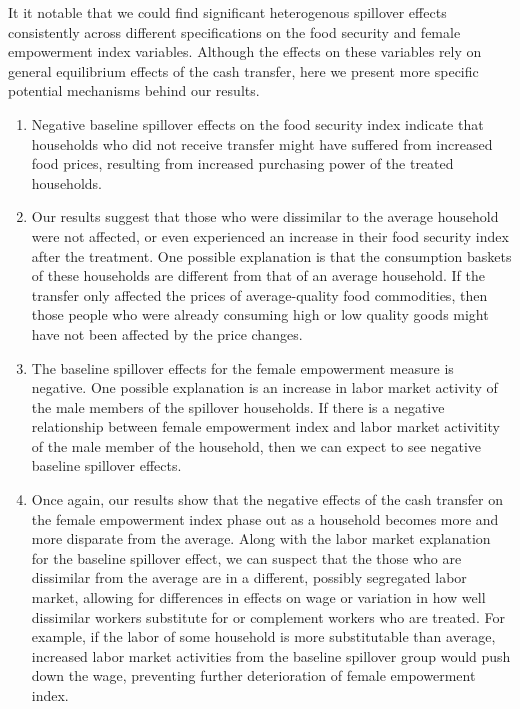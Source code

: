 \documentclass[11pt]{article}
\begin{document}
    It it notable that we could find significant heterogenous spillover effects consistently across different specifications on the food security and female empowerment index variables. Although the effects on these variables rely on general equilibrium effects of the cash transfer, here we present more specific potential mechanisms behind our results.
    \begin{enumerate}
    	\item Negative baseline spillover effects on the food security index indicate that households who did not receive transfer might have suffered from increased food prices, resulting from increased purchasing power of the treated households.
    	\item Our results suggest that those who were dissimilar to the average household were not affected, or even experienced an increase in their food security index after the treatment. One possible explanation is that the consumption baskets of these households are different from that of an average household. If the transfer only affected the prices of average-quality food commodities, then those people who were already consuming high or low quality goods might have not been affected by the price changes.
    	\item The baseline spillover effects for the female empowerment measure is negative. One possible explanation is an increase in labor market activity of the male members of the spillover households. If there is a negative relationship between female empowerment index and labor market activitity of the male member of the household, then we can expect to see negative baseline spillover effects.
    	\item Once again, our results show that the negative effects of the cash transfer on the female empowerment index phase out as a household becomes more and more disparate from the average. Along with the labor market explanation for the baseline spillover effect, we can suspect that the those who are dissimilar from the average are in a different, possibly segregated labor market, allowing for differences in effects on wage or variation in how well dissimilar workers substitute for or complement workers who are treated. For example, if the labor of some household is more substitutable than average, increased labor market activities from the baseline spillover group would push down the wage, preventing further deterioration of female empowerment index.
    \end{enumerate}
\end{document}
